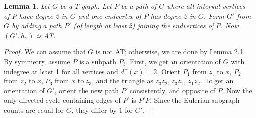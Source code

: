 \documentclass[12pt]{article}
\theoremstyle{plain}
\newtheorem{lem}[thm]{Lemma}
\theoremstyle{definition}
\theoremstyle{remark}
\begin{document}
\begin{lem}\label{AddPathReducible}
Let $G$ be a $T$-graph. Let $P$ be a path of $G$ where all internal
vertices of $P$ have degree 2 in $G$ and one endvertex of $P$ has degree 2 in
$G$.  Form $G'$ from $G$ by adding a path $P'$ (of length at least 2) joining
the endvertices of $P$.  Now $(G', h_x)$ is AT.
\end{lem}
\begin{proof}
We can assume that $G$ is not AT; otherwise, we are done by Lemma 2.1.
By symmetry, assume $P$ is a subpath $P_3$. First, we get an orientation of $G$
with indegree at least 1 for all vertices and $d^-(x) = 2$. Orient $P_1$
from $z_1$ to $x$, $P_2$ from $z_2$ to $x$, $P_3$ from $x$ to $z_3$, and the triangle
as $z_3z_2$, $z_3z_1$, $z_1z_2$.  To get an orientation of $G'$, orient the
new path $P'$ consistently, and opposite of $P$.  Now the only
directed cycle containing edges of $P'$ is $P'P$.  Since the Eulerian subgraph
counts are equal for $G$, they differ by 1 for $G'$. 
\end{proof}


\end{document}

